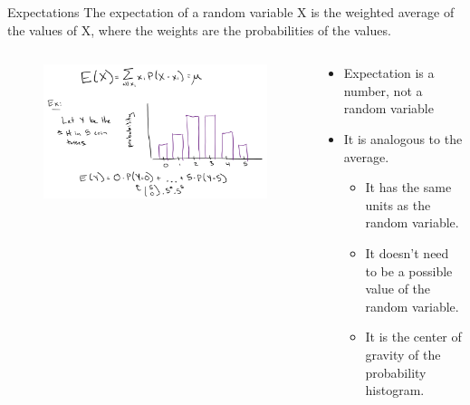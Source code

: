 \documentclass[aspectratio=169]{../latex_main/tntbeamer}  %
\begin{document}
	
	\begin{frame}{Expectations}
	    The expectation of a random variable X is the weighted average of the values of X, where the weights are the probabilities of the values.
	    \begin{columns}
	        \begin{column}{.4\textwidth}
                    \begin{figure}
                        \includegraphics[scale=.5]{Bild6}
                    \end{figure}
	        \end{column}
	        
	        
	        \begin{column}{.4\textwidth}
	            \begin{itemize}
	                \item Expectation is a number, not a random variable
	                \item It is analogous to the average.
	                \begin{itemize}
	                    \item It has the same units as the random variable.
	                    \item It doesn’t need to be a possible value of the random variable.
	                    \item It is the center of gravity of the probability histogram.
	                \end{itemize}
	            \end{itemize}
	        \end{column}
	    \end{columns}
	\end{frame}
	
	
	
\end{document}
